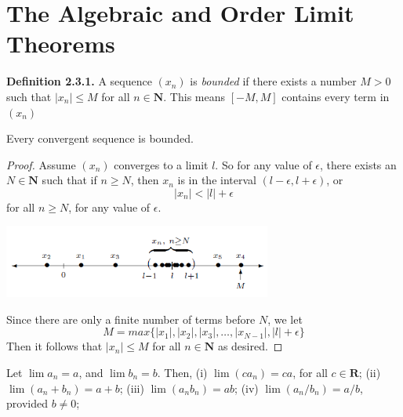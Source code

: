 \section{The Algebraic and Order Limit Theorems}
    \textbf{Definition 2.3.1.} A sequence $(x_n)$ is \textit{bounded} if there exists a number $M > 0$ such that $|x_n| \leq M$ for all $n \in \textbf{N}$.
    \newline \indent This means $[-M, M]$ contains every term in $(x_n)$
    \setcounter{theorem}{1}
    \begin{theorem}
        Every convergent sequence is bounded. 
    \end{theorem}
    \begin{proof}
        Assume $(x_n)$ converges to a limit $l$. So for any value of $\epsilon$, there exists an $N \in \textbf{N}$ such that if $n \geq N$, then $x_n$ is in the interval $(l - \epsilon, l + \epsilon)$, or 
        $$|x_n| < |l| + \epsilon$$
        for all $n \geq N$, for any value of $\epsilon$.
        \newline
        \begin{center}
            \includegraphics[width=250pt]{converges.png}
        \end{center}
        Since there are only a finite number of terms before $N$, we let
        \begin{equation*}
            M = max\{|x_1|, |x_2|, |x_3|, \dots, |x_{N-1}|, |l| + \epsilon\}
        \end{equation*}
        Then it follows that $|x_n| \leq M$ for all $n \in \textbf{N}$ as desired.
    \end{proof}
    \begin{theorem}
        Let $\lim a_n = a$, and $\lim b_n = b$. Then,
        \newline
        (i) $\lim(ca_n) = ca$, for all $c \in \textbf{R}$;
        \newline
        (ii) $\lim(a_n + b_n) = a + b$;
        \newline
        (iii) $\lim(a_nb_n) = ab$;
        \newline
        (iv) $\lim(a_n/b_n) = a/b$, provided $b \neq 0$;
    \end{theorem}
